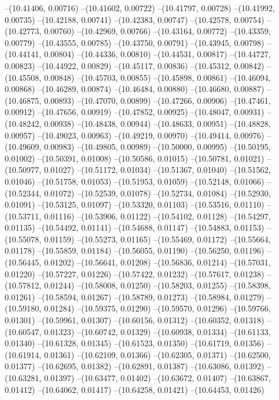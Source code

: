 --(10.41406, 0.00716)
--(10.41602, 0.00722)
--(10.41797, 0.00728)
--(10.41992, 0.00735)
--(10.42188, 0.00741)
--(10.42383, 0.00747)
--(10.42578, 0.00754)
--(10.42773, 0.00760)
--(10.42969, 0.00766)
--(10.43164, 0.00772)
--(10.43359, 0.00779)
--(10.43555, 0.00785)
--(10.43750, 0.00791)
--(10.43945, 0.00798)
--(10.44141, 0.00804)
--(10.44336, 0.00810)
--(10.44531, 0.00817)
--(10.44727, 0.00823)
--(10.44922, 0.00829)
--(10.45117, 0.00836)
--(10.45312, 0.00842)
--(10.45508, 0.00848)
--(10.45703, 0.00855)
--(10.45898, 0.00861)
--(10.46094, 0.00868)
--(10.46289, 0.00874)
--(10.46484, 0.00880)
--(10.46680, 0.00887)
--(10.46875, 0.00893)
--(10.47070, 0.00899)
--(10.47266, 0.00906)
--(10.47461, 0.00912)
--(10.47656, 0.00919)
--(10.47852, 0.00925)
--(10.48047, 0.00931)
--(10.48242, 0.00938)
--(10.48438, 0.00944)
--(10.48633, 0.00951)
--(10.48828, 0.00957)
--(10.49023, 0.00963)
--(10.49219, 0.00970)
--(10.49414, 0.00976)
--(10.49609, 0.00983)
--(10.49805, 0.00989)
--(10.50000, 0.00995)
--(10.50195, 0.01002)
--(10.50391, 0.01008)
--(10.50586, 0.01015)
--(10.50781, 0.01021)
--(10.50977, 0.01027)
--(10.51172, 0.01034)
--(10.51367, 0.01040)
--(10.51562, 0.01046)
--(10.51758, 0.01053)
--(10.51953, 0.01059)
--(10.52148, 0.01066)
--(10.52344, 0.01072)
--(10.52539, 0.01078)
--(10.52734, 0.01084)
--(10.52930, 0.01091)
--(10.53125, 0.01097)
--(10.53320, 0.01103)
--(10.53516, 0.01110)
--(10.53711, 0.01116)
--(10.53906, 0.01122)
--(10.54102, 0.01128)
--(10.54297, 0.01135)
--(10.54492, 0.01141)
--(10.54688, 0.01147)
--(10.54883, 0.01153)
--(10.55078, 0.01159)
--(10.55273, 0.01165)
--(10.55469, 0.01172)
--(10.55664, 0.01178)
--(10.55859, 0.01184)
--(10.56055, 0.01190)
--(10.56250, 0.01196)
--(10.56445, 0.01202)
--(10.56641, 0.01208)
--(10.56836, 0.01214)
--(10.57031, 0.01220)
--(10.57227, 0.01226)
--(10.57422, 0.01232)
--(10.57617, 0.01238)
--(10.57812, 0.01244)
--(10.58008, 0.01250)
--(10.58203, 0.01255)
--(10.58398, 0.01261)
--(10.58594, 0.01267)
--(10.58789, 0.01273)
--(10.58984, 0.01279)
--(10.59180, 0.01284)
--(10.59375, 0.01290)
--(10.59570, 0.01296)
--(10.59766, 0.01301)
--(10.59961, 0.01307)
--(10.60156, 0.01312)
--(10.60352, 0.01318)
--(10.60547, 0.01323)
--(10.60742, 0.01329)
--(10.60938, 0.01334)
--(10.61133, 0.01340)
--(10.61328, 0.01345)
--(10.61523, 0.01350)
--(10.61719, 0.01356)
--(10.61914, 0.01361)
--(10.62109, 0.01366)
--(10.62305, 0.01371)
--(10.62500, 0.01377)
--(10.62695, 0.01382)
--(10.62891, 0.01387)
--(10.63086, 0.01392)
--(10.63281, 0.01397)
--(10.63477, 0.01402)
--(10.63672, 0.01407)
--(10.63867, 0.01412)
--(10.64062, 0.01417)
--(10.64258, 0.01421)
--(10.64453, 0.01426)
